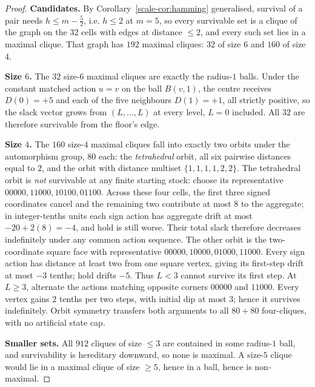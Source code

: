 \documentclass[10pt,twocolumn]{article}
\theoremstyle{plain}
\theoremstyle{definition}
\theoremstyle{remark}
\begin{document}
\begin{proof}
\textbf{Candidates.} By Corollary~\ref{scale-cor:hamming} generalised, survival of a pair needs
\(h \le m - \tfrac52\), i.e. \(h \le 2\) at \(m = 5\), so every survivable set is a clique of
the graph on the \(32\) cells with edges at distance \(\le 2\), and every such set lies in a
maximal clique. That graph has \(192\) maximal cliques: \(32\) of size \(6\) and \(160\) of
size \(4\).

\textbf{Size \(6\).} The \(32\) size-\(6\) maximal cliques are exactly the radius-\(1\) balls.
Under the constant matched action \(u = v\) on the ball \(B(v,1)\), the centre receives
\(D(0) = +5\) and each of the five neighbours \(D(1) = +1\), all strictly positive, so the
slack vector grows from \((L,\dots,L)\) at every level, \(L = 0\) included. All \(32\) are
therefore survivable from the floor's edge.

\textbf{Size \(4\).} The \(160\) size-\(4\) maximal cliques fall into exactly two orbits under
the automorphism group, \(80\) each: the \emph{tetrahedral} orbit, all six pairwise
distances equal to \(2\), and the orbit with distance multiset \(\{1,1,1,1,2,2\}\). The tetrahedral orbit is \emph{not} survivable at any finite starting stock:
choose its representative \(00000,11000,10100,01100\). Across
these four cells, the first three signed coordinates cancel and the
remaining two contribute at most \(8\) to the aggregate; in
integer-tenths units each sign action has aggregate drift at most
\(-20+2(8)=-4\), and hold is still worse. Their total slack
therefore decreases indefinitely under any common action sequence.
The other orbit is the two-coordinate square face with representative
\(00000,10000,01000,11000\). Every sign action has distance at
least two from one square vertex, giving its first-step drift at most
\(-3\) tenths; hold drifts \(-5\). Thus \(L<3\) cannot
survive its first step. At \(L\ge3\), alternate the actions
matching opposite corners \(00000\) and \(11000\). Every
vertex gains \(2\) tenths per two steps, with initial dip at
most \(3\); hence it survives indefinitely. Orbit symmetry
transfers both arguments to all \(80+80\) four-cliques, with no
artificial state cap.

\textbf{Smaller sets.} All \(912\) cliques of size \(\le 3\) are contained in some
radius-\(1\) ball, and survivability is hereditary downward, so none is maximal. A
size-\(5\) clique would lie in a maximal clique of size \(\ge 5\), hence in a ball, hence is
non-maximal.
\end{proof}
\end{document}
